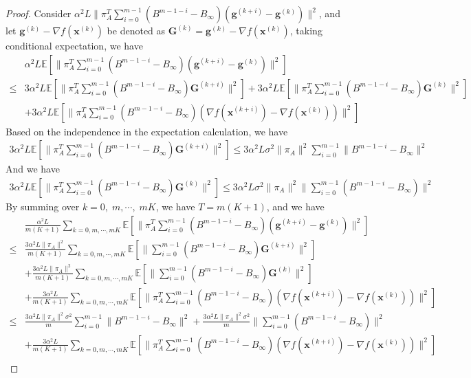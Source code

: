 \documentclass{article}
\newcommand{\vg}{{\mathbf{g}}}
\newcommand{\vx}{{\mathbf{x}}}
\newcommand{\EE}[1]{\mathbb{E}\left[#1\right]}
\newcommand{\norm}[1]{\| #1 \|}
\begin{document}
\begin{proof}
  Consider $\alpha^2L\norm{\pi_A^{T}\sum_{i=0}^{m-1}(B^{m-1-i}-B_{\infty})(\vg^{(k+i)}-\vg^{(k)})}^2$, and let $\vg^{(k)}-\nabla f(\vx^{(k)})$ be denoted as $\mathbf{G}^{(k)}=\vg^{(k)}-\nabla f(\vx^{(k)})$, taking conditional expectation, we have
  \begin{align*}
    &\alpha^2L\EE{\norm{\pi_A^{T}\sum_{i=0}^{m-1}(B^{m-1-i}-B_{\infty})(\vg^{(k+i)}-\vg^{(k)})}^2}\\ 
    \leq &3\alpha^2L\EE{\norm{\pi_A^{T}\sum_{i=0}^{m-1}(B^{m-1-i}-B_{\infty})\mathbf{G}^{(k+i)}}^2}+3\alpha^2L\EE{\norm{\pi_A^{T}\sum_{i=0}^{m-1}(B^{m-1-i}-B_{\infty})\mathbf{G}^{(k)}}^2}\\&+3\alpha^2L\EE{\norm{\pi_A^{T}\sum_{i=0}^{m-1}(B^{m-1-i}-B_{\infty})(\nabla f(\vx^{(k+i)})-\nabla f(\vx^{(k)}))}^2}
  \end{align*}
  Based on the independence in the expectation calculation, we have 
  \begin{align*}
    3\alpha^2L\EE{\norm{\pi_A^{T}\sum_{i=0}^{m-1}(B^{m-1-i}-B_{\infty})\mathbf{G}^{(k+i)}}^2}\leq 3\alpha^2L\sigma^2\norm{\pi_A}^2\sum_{i=0}^{m-1}\norm{B^{m-1-i}-B_{\infty}}^2
  \end{align*}
  And we have
  \begin{align*}
    3\alpha^2L\EE{\norm{\pi_A^{T}\sum_{i=0}^{m-1}(B^{m-1-i}-B_{\infty})\mathbf{G}^{(k)}}^2}\leq 3\alpha^2L\sigma^2 \norm{\pi_A}^2\norm{\sum_{i=0}^{m-1}(B^{m-1-i}-B_{\infty})}^2
  \end{align*}
  By summing over $k=0,\;m,\cdots,\;mK$, we have $T=m(K+1)$, and we have
  \begin{align*}
    &\frac{\alpha^2L}{m(K+1)}\sum_{k=0,m,\cdots,mK}\EE{\norm{\pi_A^{T}\sum_{i=0}^{m-1}(B^{m-1-i}-B_{\infty})(\vg^{(k+i)}-\vg^{(k)})}^2}\\ 
    \leq &\frac{3\alpha^2L\norm{\pi_A}^2}{m(K+1)}\sum_{k=0,m,\cdots,mK}\EE{\norm{\sum_{i=0}^{m-1}(B^{m-1-i}-B_{\infty})\mathbf{G}^{(k+i)}}^2}\\&+\frac{3\alpha^2L\norm{\pi_A}^2}{m(K+1)}\sum_{k=0,m,\cdots,mK}\EE{\norm{\sum_{i=0}^{m-1}(B^{m-1-i}-B_{\infty})\mathbf{G}^{(k)}}^2}\\&+\frac{3\alpha^2L}{m(K+1)}\sum_{k=0,m,\cdots,mK}\EE{\norm{\pi_A^T\sum_{i=0}^{m-1}(B^{m-1-i}-B_{\infty})(\nabla f(\vx^{(k+i)})-\nabla f(\vx^{(k)}))}^2}\\ 
    \leq&\frac{3\alpha^2L\norm{\pi_A}^2\sigma^2}{m}\sum_{i=0}^{m-1}\norm{B^{m-1-i}-B_{\infty}}^2+\frac{3\alpha^2L\norm{\pi_A}^2\sigma^2}{m}\norm{\sum_{i=0}^{m-1}(B^{m-1-i}-B_{\infty})}^2\\&+\frac{3\alpha^2L}{m(K+1)}\sum_{k=0,m,\cdots,mK}\EE{\norm{\pi_A^T\sum_{i=0}^{m-1}(B^{m-1-i}-B_{\infty})(\nabla f(\vx^{(k+i)})-\nabla f(\vx^{(k)}))}^2}\\ 

\end{align*}
\end{proof}
\end{document}

